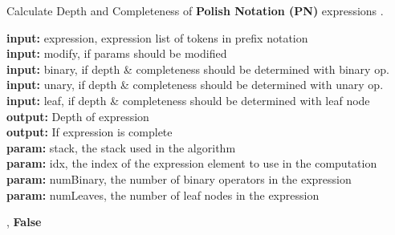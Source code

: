 \documentclass[runningheads]{llncs}
\begin{document}
\begin{algorithm}
\scriptsize
\caption{Calculate Depth and Completeness of \textbf{Polish Notation (PN)} expressions \cite{77180279}.}
\label{alg:getPNdepth_cache}
\hspace*{\algorithmicindent} \textbf{input:}  expression, expression list of tokens in prefix notation \\
\hspace*{\algorithmicindent} \textbf{input:}  modify, if params should be modified \\
\hspace*{\algorithmicindent} \textbf{input:}  binary, if depth \& completeness should be determined with binary op.  \\
\hspace*{\algorithmicindent} \textbf{input:}  unary, if depth \& completeness should be determined with unary op.  \\
\hspace*{\algorithmicindent} \textbf{input:} leaf, if depth \& completeness should be determined with leaf node \\
\hspace*{\algorithmicindent} \textbf{output:} Depth of expression\\
\hspace*{\algorithmicindent} \textbf{output:} If expression is complete \\
\hspace*{\algorithmicindent} \textbf{param:} stack, the stack used in the algorithm \\
\hspace*{\algorithmicindent} \textbf{param:} idx, the index of the expression element to use in the computation\\
\hspace*{\algorithmicindent} \textbf{param:} numBinary, the number of binary operators in the expression \\
\hspace*{\algorithmicindent} \textbf{param:} numLeaves, the number of leaf nodes in the expression 
\begin{algorithmic}[1]

        \State {}, \textbf{False}
    \EndIf


\end{algorithmic}
\end{algorithm}
\end{document}
